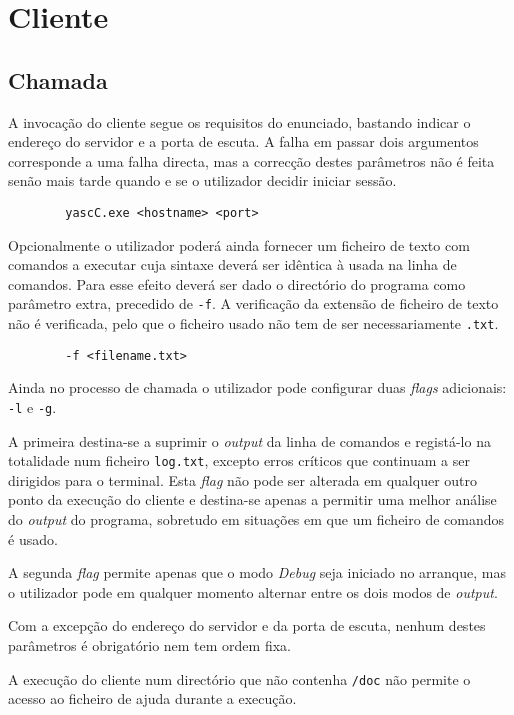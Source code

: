 \section{Cliente\label{sec:Cliente}}

\subsection{Chamada\label{sec:cliente_chamada}}

	\indent\indent A invocação do cliente segue os requisitos do enunciado, bastando indicar o endereço do servidor e a porta de escuta.
	A falha em passar dois argumentos corresponde a uma falha directa, mas a correcção destes parâmetros não é feita senão mais tarde quando e se o utilizador decidir iniciar sessão.
	\begin{verbatim}
		yascC.exe <hostname> <port>
	\end{verbatim}
	
	Opcionalmente o utilizador poderá ainda fornecer um ficheiro de texto com comandos a executar cuja sintaxe deverá ser idêntica à usada na linha de comandos.
	Para esse efeito deverá ser dado o directório do programa como parâmetro extra, precedido de \verb|-f|.
	A verificação da extensão de ficheiro de texto não é verificada, pelo que o ficheiro usado não tem de ser necessariamente \verb|.txt|.
	\begin{verbatim}
		-f <filename.txt>
	\end{verbatim}

	Ainda no processo de chamada o utilizador pode configurar duas \emph{flags} adicionais: \verb|-l| e \verb|-g|.
	
	A primeira destina-se a suprimir o \emph{output} da linha de comandos e registá-lo na totalidade num ficheiro \verb|log.txt|, excepto erros críticos que continuam a ser dirigidos para o terminal.
	Esta \emph{flag} não pode ser alterada em qualquer outro ponto da execução do cliente e destina-se apenas a permitir uma melhor análise do \emph{output} do programa, sobretudo em situações em que um ficheiro de comandos é usado.
	
	A segunda \emph{flag} permite apenas que o modo \emph{Debug} seja iniciado no arranque, mas o utilizador pode em qualquer momento alternar entre os dois modos de \emph{output}.
	
	Com a excepção do endereço do servidor e da porta de escuta, nenhum destes parâmetros é obrigatório nem tem ordem fixa.
	
	A execução do cliente num directório que não contenha \verb|/doc| não permite o acesso ao ficheiro de ajuda durante a execução.

